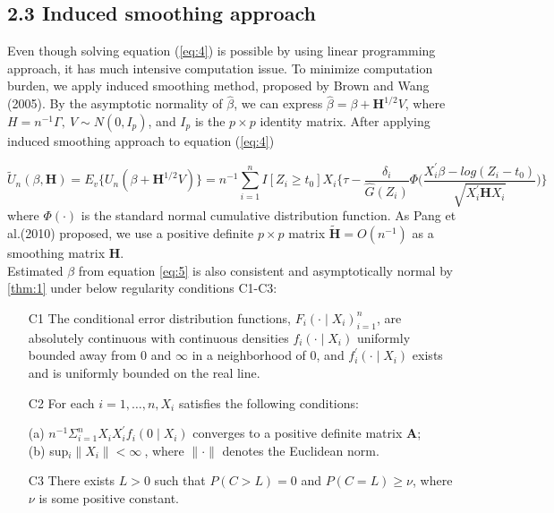 \documentclass[12pt]{article}
\begin{document}
\subsection{2.3 Induced smoothing approach}
	\noindent Even though solving equation (\ref{eq:4}) is possible by using linear programming approach, it has much intensive computation issue. To minimize computation burden, we apply induced smoothing method, proposed by Brown and Wang (2005). By the asymptotic normality of $\hat{\beta}$, we can express $\hat{\beta} = \beta+\textbf{H}^{1/2}V$, where $H = n^{-1}\Gamma,\ V \sim N(0, I_p)$, and $I_p$ is the $p \times p $ identity matrix. After applying induced smoothing approach to equation (\ref{eq:4})
	
	\begin{equation} \label{eq:5}
	\tilde{U}_n(\beta, \textbf{H}) = E_v \{U_n(\beta+\textbf{H}^{1/2}V)\} = n^{-1} \sum_{i=1}^{n} I[Z_i \geq t_0] X_i \Big\{\tau - \frac{\delta_i}{\hat{G}(Z_i)}\Phi\Big(\frac{X_i^\prime\beta-log(Z_i-t_0)}{\sqrt{X_i^{\prime} \textbf{H} X_{i}}}\Big)\Big\}
	\end{equation} 
	where $\Phi(\cdot)$ is the standard normal cumulative distribution function. As Pang et al.(2010) proposed, we use a positive definite $p \times p$ matrix $\tilde{\textbf{H}} = O(n^{-1})$ as a smoothing matrix $\textbf{H}$.\\ Estimated $\beta$ from equation \ref{eq:5} is also consistent and asymptotically normal by \ref{thm:1} under below regularity conditions C1-C3:
	\begin{enumerate}
		\item[C1] The conditional error distribution functions, $F_{i}(\cdot\mid X_{i})^{n}_{i=1}$, are absolutely continuous with continuous densities $f_{i}(\cdot\mid X_{i})$ uniformly bounded away from $0$ and $\infty$ in a neighborhood of $0$, and $f_{i}^{\prime}(\cdot\mid X_{i})$ exists and is uniformly bounded on the real line.
		\item[C2] For each $i=1,\dots, n, X_{i}$ satisfies the following conditions:
		\begin{flushleft}
			(a) $n^{-1}\Sigma_{i=1}^{n} X_{i} X_{i}^{\prime}f_{i}(0\mid X_{i})$ converges to a positive definite matrix \textbf{A};\\
			(b) sup$_{i}\lVert X_{i} \rVert < \infty\ $, where $\lVert \cdot \rVert$ denotes the Euclidean norm.\\
		\end{flushleft}
		\item[C3] There exists $L>0$ such that $P(C>L)=0$ and $P(C=L)\geq\nu$, where $\nu$ is some positive constant.
	\end{enumerate} 
\end{document}
